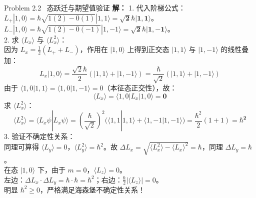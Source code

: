 \documentclass[a4paper,11pt]{article}
\begin{document}
\begin{solution}{Problem 2.2 \textbar\ 态跃迁与期望值验证}
\textbf{解：}
1. 代入阶梯公式：\\
$L_+ |1, 0\rangle = \hbar \sqrt{1(2) - 0(1)} |1, 1\rangle = \mathbf{\sqrt{2}\hbar |1, 1\rangle}$。\\
$L_- |1, 0\rangle = \hbar \sqrt{1(2) - 0(-1)} |1, -1\rangle = \mathbf{\sqrt{2}\hbar |1, -1\rangle}$。\\
2. 求 $\langle L_x \rangle$ 与 $\langle L_x^2 \rangle$：\\
因为 $L_x = \frac{1}{2}(L_+ + L_-)$，作用在 $|1, 0\rangle$ 上得到正交态 $|1, 1\rangle$ 与 $|1, -1\rangle$ 的线性叠加：
\[ L_x |1, 0\rangle = \frac{\sqrt{2}\hbar}{2} (|1, 1\rangle + |1, -1\rangle) = \frac{\hbar}{\sqrt{2}} (|1, 1\rangle + |1, -1\rangle) \]
由于 $\langle 1, 0 | 1, 1 \rangle = \langle 1, 0 | 1, -1 \rangle = 0$（本征态正交性），故：
\[ \langle L_x \rangle = \langle 1, 0 | L_x | 1, 0 \rangle = \mathbf{0} \]
求 $\langle L_x^2 \rangle$：
\[ \langle L_x^2 \rangle = \langle L_x \psi | L_x \psi \rangle = \left( \frac{\hbar}{\sqrt{2}} \right)^2 \big( \langle 1, 1 | 1, 1 \rangle + \langle 1, -1 | 1, -1 \rangle \big) = \frac{\hbar^2}{2}(1 + 1) = \mathbf{\hbar^2} \]
3. 验证不确定性关系：\\
同理可算得 $\langle L_y \rangle = 0$，$\langle L_y^2 \rangle = \hbar^2$。故 $\Delta L_x = \sqrt{\langle L_x^2 \rangle - \langle L_x \rangle^2} = \hbar$，同理 $\Delta L_y = \hbar$。\\
在态 $|1, 0\rangle$ 下，由于 $m=0$，$\langle L_z \rangle = 0$。\\
左边：$\Delta L_x \cdot \Delta L_y = \hbar \cdot \hbar = \hbar^2$；右边：$\frac{\hbar}{2} |\langle L_z \rangle| = 0$。\\
明显 $\hbar^2 \ge 0$，严格满足海森堡不确定性关系！
\end{solution}
\end{document}
